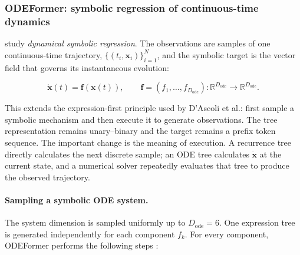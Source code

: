 \subsubsection{ODEFormer: symbolic regression of continuous-time dynamics}

\citet{dascoli2024odeformer} study \emph{dynamical symbolic regression}. The
observations are samples of one continuous-time trajectory,
$\{(t_i,\mathbf x_i)\}_{i=1}^{N}$, and the symbolic target is the vector field
that governs its instantaneous evolution:

\begin{equation}
\dot{\mathbf x}(t)=\mathbf f(\mathbf x(t)),
\qquad
\mathbf f=(f_1,\ldots,f_{D_{\mathrm{ode}}}):
\mathbb R^{D_{\mathrm{ode}}}\rightarrow
\mathbb R^{D_{\mathrm{ode}}}.
\label{eq:odeformer-vector-field}
\end{equation}

This extends the expression-first principle used by D'Ascoli et al.: first
sample a symbolic mechanism and then execute it to generate observations. The
tree representation remains unary--binary and the target remains a prefix
token sequence. The important change is the meaning of execution. A recurrence
tree directly calculates the next discrete sample; an ODE tree calculates
$\dot{\mathbf x}$ at the current state, and a numerical solver repeatedly
evaluates that tree to produce the observed trajectory.

\paragraph{Sampling a symbolic ODE system.}
The system dimension is sampled uniformly up to
$D_{\mathrm{ode}}=6$. One expression tree is generated independently for each
component $f_k$. For every component, ODEFormer performs the following steps
\citep{dascoli2024odeformer}:

